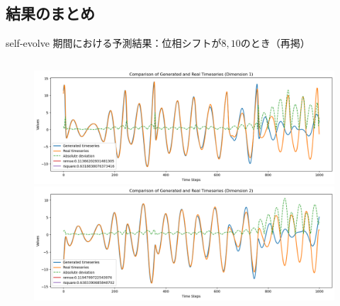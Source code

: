 \subsection{結果のまとめ}
\begin{frame}{self-evolve 期間における予測結果：位相シフトが$8, 10$のとき（再掲）}
    \begin{columns}[T] %
      \begin{column}{.5\textwidth}
        \begin{figure}
          \vspace{-.5cm}
          \begin{minipage}[c][.27\textheight][c]{\linewidth}
            \centering
            \includegraphics[width=0.7\linewidth]{Fig/8.x.png}
          \end{minipage}
      
          \vspace{-.5em}
  
          \begin{minipage}[c][.27\textheight][c]{\linewidth}
            \centering
            \includegraphics[width=0.7\linewidth]{Fig/8.y.png}
          \end{minipage}
          

\end{figure}
\end{column}
\end{columns}
\end{frame}

